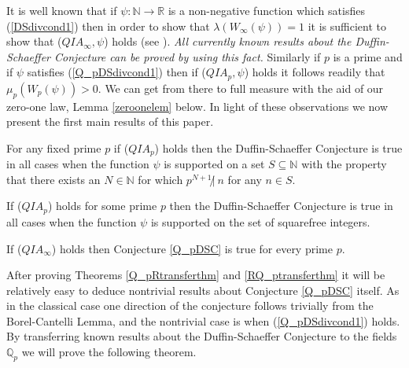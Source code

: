 \documentclass[12pt,reqno]{amsart}
\begin{document}
It is well known that if $\psi:{\mathbb{N}}{\rightarrow}{\mathbb{R}}$ is a non-negative function which satisfies (\ref{DSdivcond1}) then in order to show that $\lambda (W_\infty (\psi))=1$ it is sufficient to show that ($QIA_\infty, \psi$) holds (see \cite[Lemma 2.3]{HarmanMNT}). {\em All currently known results about the Duffin-Schaeffer Conjecture can be proved by using this fact.} Similarly if $p$ is a prime and if $\psi$ satisfies (\ref{Q_pDSdivcond1}) then if ($QIA_p, \psi$) holds it follows readily that $\mu_p(W_p(\psi))>0$. We can get from there to full measure with the aid of our zero-one law, Lemma \ref{zeroonelem} below. In light of these observations we now present the first main results of this paper.
\begin{theorem}\label{Q_pRtransferthm}
For any fixed prime $p$ if ($QIA_p$) holds then the Duffin-Schaeffer Conjecture is true in all cases when the function $\psi$ is supported on a set $S\subseteq{\mathbb{N}}$ with the property that there exists an $N\in{\mathbb{N}}$ for which $p^{N+1}\not| ~ n$ for any $n\in S$.
\end{theorem}
\begin{corollary}\label{Q_pRtransfercor}
If ($QIA_p$) holds for some prime $p$ then the Duffin-Schaeffer Conjecture is true in all cases when the function $\psi$ is supported on the set of squarefree integers.
\end{corollary}
\begin{theorem}\label{RQ_ptransferthm}
If ($QIA_\infty$) holds then Conjecture \ref{Q_pDSC} is true for every prime $p$.
\end{theorem}
After proving Theorems \ref{Q_pRtransferthm} and \ref{RQ_ptransferthm} it will be relatively easy to deduce nontrivial results about Conjecture \ref{Q_pDSC} itself. As in the classical case one direction of the conjecture follows trivially from the Borel-Cantelli Lemma, and the nontrivial case is when (\ref{Q_pDSdivcond1}) holds. By transferring known results about the Duffin-Schaeffer Conjecture to the fields ${\mathbb{Q}}_p$ we will prove the following theorem.
\end{document}
